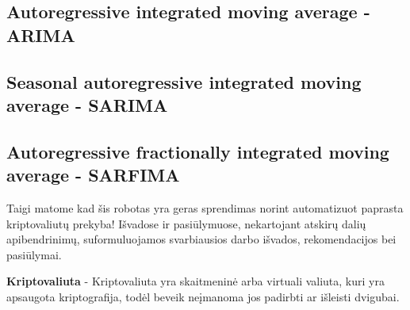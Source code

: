 \documentclass{VUMIFInfKursinis}
\begin{document}
\subsection{Autoregressive integrated moving average - ARIMA}

\subsection{Seasonal autoregressive integrated moving average - SARIMA}

\subsection{Autoregressive fractionally integrated moving average - SARFIMA}


Taigi matome kad šis robotas yra geras sprendimas norint automatizuot paprasta kriptovaliutų prekyba!
Išvadose ir pasiūlymuose, nekartojant atskirų dalių apibendrinimų,
suformuluojamos svarbiausios darbo išvados, rekomendacijos bei pasiūlymai.


\textbf{Kriptovaliuta} - Kriptovaliuta yra skaitmeninė arba virtuali valiuta, kuri yra apsaugota kriptografija, todėl beveik neįmanoma jos padirbti ar išleisti dvigubai.

\printbibliography[heading=bibintoc] %

\appendix  %
\end{document}
